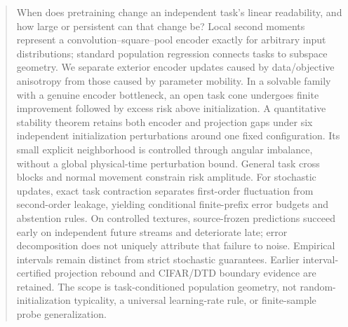 \begin{abstract}
When does pretraining change an independent task's linear readability, and how large or persistent can that change be? Local second moments represent a convolution--square--pool encoder exactly for arbitrary input distributions; standard population regression connects tasks to subspace geometry. We separate exterior encoder updates caused by data/objective anisotropy from those caused by parameter mobility. In a solvable family with a genuine encoder bottleneck, an open task cone undergoes finite improvement followed by excess risk above initialization. A quantitative stability theorem retains both encoder and projection gaps under six independent initialization perturbations around one fixed configuration. Its small explicit neighborhood is controlled through angular imbalance, without a global physical-time perturbation bound. General task cross blocks and normal movement constrain risk amplitude. For stochastic updates, exact task contraction separates first-order fluctuation from second-order leakage, yielding conditional finite-prefix error budgets and abstention rules. On controlled textures, source-frozen predictions succeed early on independent future streams and deteriorate late; error decomposition does not uniquely attribute that failure to noise. Empirical intervals remain distinct from strict stochastic guarantees. Earlier interval-certified projection rebound and CIFAR/DTD boundary evidence are retained. The scope is task-conditioned population geometry, not random-initialization typicality, a universal learning-rate rule, or finite-sample probe generalization.
\end{abstract}
